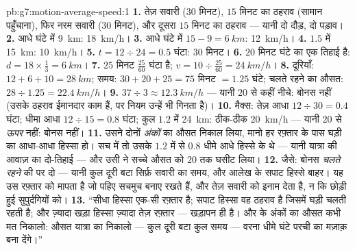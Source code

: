 \begin{solution}{pb:g7:motion-average-speed:1}
\textbf{1.} तेज़ सवारी ($30$ मिनट), $15$ मिनट का ठहराव (सामान
पहुँचाना), फिर नरम सवारी ($30$ मिनट), और दूसरा $15$ मिनट का ठहराव ---
यानी दो दौड़, दो पड़ाव।
\textbf{2.} आधे घंटे में \qty{9}{km}: \qty{18}{km/h}।
\textbf{3.} आधे घंटे में $15 - 9 = \qty{6}{km}$: \qty{12}{km/h}।
\textbf{4.} $1.5$  में \qty{15}{km}: \qty{10}{km/h}।
\textbf{5.} $t = 12 \div 24 = 0.5$ घंटा: $30$ मिनट।
\textbf{6.} $20$ मिनट घंटे का एक तिहाई है: $d = 18 \times
\tfrac{1}{3} = \qty{6}{km}$।
\textbf{7.} $25$ मिनट $\tfrac{25}{60}$ घंटा है; $v = 10 \div
\tfrac{25}{60} = \qty{24}{km/h}$।
\textbf{8.} दूरियाँ: $12 + 6 + 10 = \qty{28}{km}$; समय:
$30 + 20 + 25 = 75$ मिनट $= 1.25$ घंटे; चलते रहने का औसत:
$28 \div 1.25 = \qty{22.4}{km/h}$।
\textbf{9.} $37 \div 3 \approx \qty{12.3}{km/h}$ --- यानी $20$ से
कहीं नीचे: बोनस नहीं (उसके ठहराव ईमानदार काम हैं, पर नियम उन्हें भी
गिनता है)।
\textbf{10.} मैक्स: तेज़ आधा $12 \div 30 = 0.4$ घंटा; धीमा आधा
$12 \div 15 = 0.8$ घंटा; कुल $1.2$  में \qty{24}{km}: ठीक-ठीक
\qty{20}{km/h} --- यानी $20$ से \emph{ऊपर} नहीं: बोनस नहीं।
\textbf{11.} उसने दोनों \emph{अंकों} का औसत निकाल लिया, मानो हर
रफ़्तार के पास घड़ी का आधा-आधा हिस्सा हो। सच में तो उसके $1.2$ 
में से $0.8$ धीमे आधे हिस्से के थे --- यानी यात्रा की आवाज़ का
दो-तिहाई --- और उसी ने सच्चे औसत को $20$ तक घसीट लिया।
\textbf{12.} जैसे: बोनस \emph{चलते रहने} की  पर दो --- यानी
कुल दूरी बटा सिर्फ़ सवारी का समय, और आलेख के सपाट हिस्से बाहर। यह उस
रफ़्तार को मापता है जो पहिए सचमुच बनाए रखते हैं, और तेज़ सवारी को
इनाम देता है, न कि छोड़ी हुई सुपुर्दगियों को।
\textbf{13.} ``सीधा हिस्सा एक-सी रफ़्तार है; सपाट हिस्सा वह ठहराव है
जिसमें घड़ी चलती रहती है; और ज़्यादा खड़ा हिस्सा ज़्यादा तेज़ रफ़्तार
--- खड़ापन ही  है। और  के अंकों का औसत कभी मत निकालो: औसत
यात्रा का निकालो --- कुल दूरी बटा कुल समय --- वरना धीमे घंटे परची का
मज़ाक़ बना देंगे।''
\end{solution}
